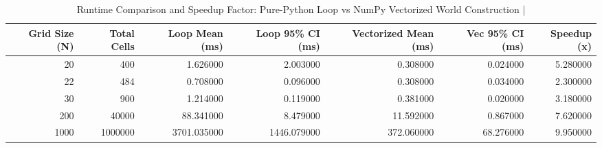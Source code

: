 \begin{table}[htbp]
\centering
\caption{Runtime Comparison and Speedup Factor: Pure-Python Loop vs NumPy Vectorized World Construction | \stampline}
\label{tab:partA_speedup}
\begin{tabular}{rrrrrrr}
\toprule
Grid Size (N) & Total Cells & Loop Mean (ms) & Loop 95\% CI (ms) & Vectorized Mean (ms) & Vec 95\% CI (ms) & Speedup (x) \\
\midrule
20 & 400 & 1.626000 & 2.003000 & 0.308000 & 0.024000 & 5.280000 \\
22 & 484 & 0.708000 & 0.096000 & 0.308000 & 0.034000 & 2.300000 \\
30 & 900 & 1.214000 & 0.119000 & 0.381000 & 0.020000 & 3.180000 \\
200 & 40000 & 88.341000 & 8.479000 & 11.592000 & 0.867000 & 7.620000 \\
1000 & 1000000 & 3701.035000 & 1446.079000 & 372.060000 & 68.276000 & 9.950000 \\
\bottomrule
\end{tabular}

\end{table}
